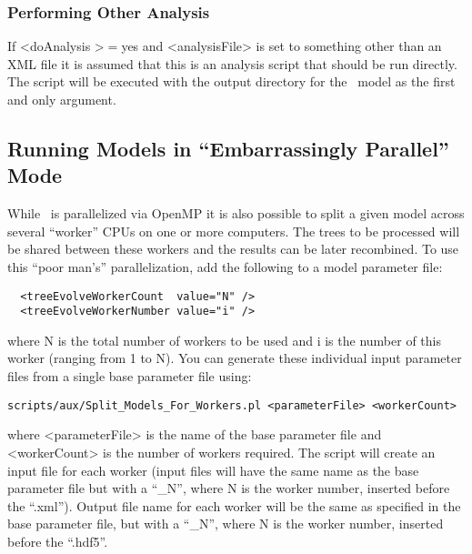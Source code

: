 \subsubsection{Performing Other Analysis}

If {\normalfont \ttfamily \textless doAnalysis \textgreater}$=${\normalfont \ttfamily yes} and {\normalfont \ttfamily \textless analysisFile\textgreater} is set to something other than an XML file it is assumed that this is an analysis script that should be run directly. The script will be executed with the output directory for the \glc\ model as the first and only argument.

\subsection{Running Models in ``Embarrassingly Parallel'' Mode}

While \glc\ is parallelized via OpenMP it is also possible to split a given model across several ``worker'' CPUs on one or more computers. The trees to be processed will be shared between these workers and the results can be later recombined. To use this ``poor man's'' parallelization, add the following to a model parameter file:
\begin{verbatim}
  <treeEvolveWorkerCount  value="N" />
  <treeEvolveWorkerNumber value="i" />
\end{verbatim}
where {\normalfont \ttfamily N} is the total number of workers to be used and {\normalfont \ttfamily i} is the number of this worker (ranging from 1 to {\normalfont \ttfamily N}). You can generate these individual input parameter files from a single base parameter file using:
\begin{verbatim}
scripts/aux/Split_Models_For_Workers.pl <parameterFile> <workerCount>
\end{verbatim}
where {\normalfont \ttfamily <parameterFile>} is the name of the base parameter file and {\normalfont \ttfamily <workerCount>} is the number of workers required. The script will create an input file for each worker (input files will have the same name as the base parameter file but with a ``{\normalfont \ttfamily \_N}'', where {\normalfont \ttfamily N} is the worker number, inserted before the ``{\normalfont \ttfamily .xml}''). Output file name for each worker will be the same as specified in the base parameter file, but with a ``{\normalfont \ttfamily \_N}'', where {\normalfont \ttfamily N} is the worker number, inserted before the ``{\normalfont \ttfamily .hdf5}''.

